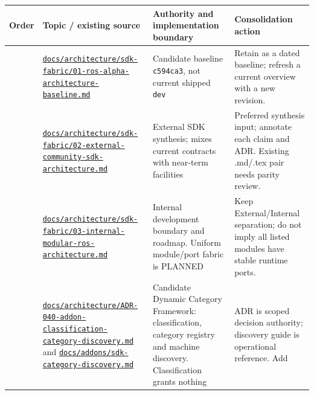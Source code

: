 \documentclass[
  10pt,
]{article}
\begin{document}
\begin{longtable}[]{@{}>{\raggedright\arraybackslash}p{}>{\raggedright\arraybackslash}p{}>{\raggedright\arraybackslash}p{}>{\raggedright\arraybackslash}p{}@{}}
\toprule\noalign{}
Order & Topic / existing source & Authority and implementation boundary
& Consolidation action \\
\midrule\noalign{}
\endhead
\bottomrule\noalign{}
\endlastfoot
1 &
\href{https://github.com/vonstegen/2.0.0-alpha/blob/34a2be796ffc062605f1a638c1e666dafce88250/docs/architecture/sdk-fabric/01-ros-alpha-architecture-baseline.md}{\nolinkurl{docs/architecture/sdk-fabric/01-ros-alpha-architecture-baseline.md}}
& Candidate baseline \nolinkurl{c594ca3}, not current shipped \nolinkurl{dev}
& Retain as a dated baseline; refresh a current overview with a new
revision. \\
2 &
\href{https://github.com/vonstegen/2.0.0-alpha/blob/34a2be796ffc062605f1a638c1e666dafce88250/docs/architecture/sdk-fabric/02-external-community-sdk-architecture.md}{\nolinkurl{docs/architecture/sdk-fabric/02-external-community-sdk-architecture.md}}
& External SDK synthesis; mixes current contracts with near-term
facilities & Preferred synthesis input; annotate each claim and ADR.
Existing .md/.tex pair needs parity review. \\
3 &
\href{https://github.com/vonstegen/2.0.0-alpha/blob/34a2be796ffc062605f1a638c1e666dafce88250/docs/architecture/sdk-fabric/03-internal-modular-ros-architecture.md}{\nolinkurl{docs/architecture/sdk-fabric/03-internal-modular-ros-architecture.md}}
& Internal development boundary and roadmap. Uniform module/port fabric
is PLANNED & Keep External/Internal separation; do not imply all listed
modules have stable runtime ports. \\
4 &
\href{https://github.com/vonstegen/2.0.0-alpha/blob/297e64ad4946bd44f4497c5dfedc11c58a8b1314/docs/architecture/ADR-040-addon-classification-category-discovery.md}{\nolinkurl{docs/architecture/ADR-040-addon-classification-category-discovery.md}}
and
\href{https://github.com/vonstegen/2.0.0-alpha/blob/297e64ad4946bd44f4497c5dfedc11c58a8b1314/docs/addons/sdk-category-discovery.md}{\nolinkurl{docs/addons/sdk-category-discovery.md}}
& Candidate Dynamic Category Framework: classification, category
registry and machine discovery. Classification grants nothing & ADR is
scoped decision authority; discovery guide is operational reference. Add

\end{longtable}
\end{document}
